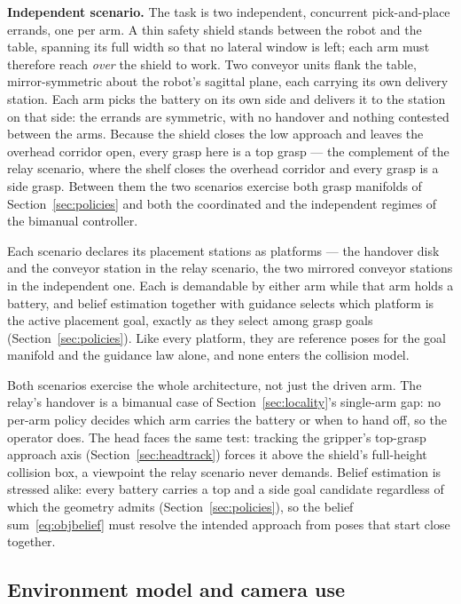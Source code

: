 \textbf{Independent scenario.} The task is two independent, concurrent pick-and-place errands, one per arm. A thin safety shield stands between the robot and the table, spanning its full width so that no lateral window is left; each arm must therefore reach \emph{over} the shield to work. Two conveyor units flank the table, mirror-symmetric about the robot's sagittal plane, each carrying its own delivery station. Each arm picks the battery on its own side and delivers it to the station on that side: the errands are symmetric, with no handover and nothing contested between the arms. Because the shield closes the low approach and leaves the overhead corridor open, every grasp here is a top grasp --- the complement of the relay scenario, where the shelf closes the overhead corridor and every grasp is a side grasp. Between them the two scenarios exercise both grasp manifolds of Section~\ref{sec:policies} and both the coordinated and the independent regimes of the bimanual controller.

Each scenario declares its placement stations as platforms --- the handover disk and the conveyor station in the relay scenario, the two mirrored conveyor stations in the independent one. Each is demandable by either arm while that arm holds a battery, and belief estimation together with guidance selects which platform is the active placement goal, exactly as they select among grasp goals (Section~\ref{sec:policies}). Like every platform, they are reference poses for the goal manifold and the guidance law alone, and none enters the collision model.

Both scenarios exercise the whole architecture, not just the driven arm. The relay's handover is a bimanual case of Section~\ref{sec:locality}'s single-arm gap: no per-arm policy decides which arm carries the battery or when to hand off, so the operator does. The head faces the same test: tracking the gripper's top-grasp approach axis (Section~\ref{sec:headtrack}) forces it above the shield's full-height collision box, a viewpoint the relay scenario never demands. Belief estimation is stressed alike: every battery carries a top and a side goal candidate regardless of which the geometry admits (Section~\ref{sec:policies}), so the belief sum~\eqref{eq:objbelief} must resolve the intended approach from poses that start close together.

\subsection{Environment model and camera use}
\label{sec:studyenv}


